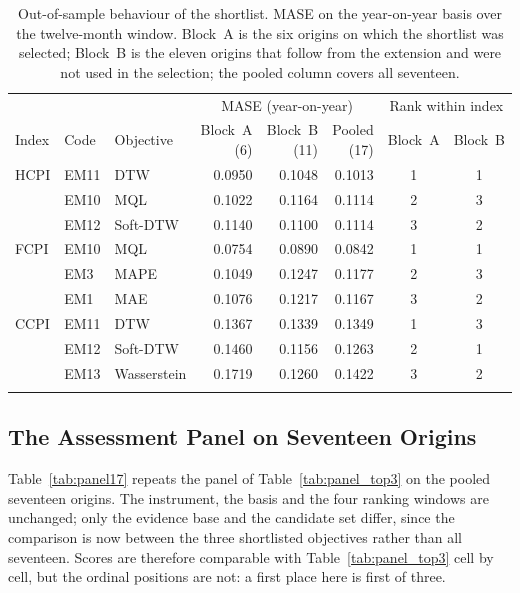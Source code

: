 \documentclass[12pt]{article}
\begin{document}
\begin{table}[htbp]\centering
\caption{Out-of-sample behaviour of the shortlist. MASE on the year-on-year basis over the twelve-month window. Block~A is the six origins on which the shortlist was selected; Block~B is the eleven origins that follow from the extension and were not used in the selection; the pooled column covers all seventeen.}
\label{tab:stability}
\begin{threeparttable}\small
\begin{tabular}{@{}l l l r r r c c@{}}
\toprule
 & & & \multicolumn{3}{c}{MASE (year-on-year)} & \multicolumn{2}{c}{Rank within index} \\
\cmidrule(lr){4-6}\cmidrule(lr){7-8}
Index & Code & Objective & Block~A (6) & Block~B (11) & Pooled (17) & Block~A & Block~B \\
\midrule
HCPI & EM11 & DTW & 0.0950 & 0.1048 & 0.1013 & 1 & 1 \\
 & EM10 & MQL & 0.1022 & 0.1164 & 0.1114 & 2 & 3 \\
 & EM12 & Soft-DTW & 0.1140 & 0.1100 & 0.1114 & 3 & 2 \\
\addlinespace[2pt]
FCPI & EM10 & MQL & 0.0754 & 0.0890 & 0.0842 & 1 & 1 \\
 & EM3 & MAPE & 0.1049 & 0.1247 & 0.1177 & 2 & 3 \\
 & EM1 & MAE & 0.1076 & 0.1217 & 0.1167 & 3 & 2 \\
\addlinespace[2pt]
CCPI & EM11 & DTW & 0.1367 & 0.1339 & 0.1349 & 1 & 3 \\
 & EM12 & Soft-DTW & 0.1460 & 0.1156 & 0.1263 & 2 & 1 \\
 & EM13 & Wasserstein & 0.1719 & 0.1260 & 0.1422 & 3 & 2 \\
\addlinespace[2pt]
\bottomrule
\end{tabular}
\end{threeparttable}
\end{table}

\subsection{The Assessment Panel on Seventeen Origins}
\label{sec:res-panel17}

Table~\ref{tab:panel17} repeats the panel of
Table~\ref{tab:panel_top3} on the pooled seventeen origins. The instrument,
the basis and the four ranking windows are unchanged; only the evidence base
and the candidate set differ, since the comparison is now between the three
shortlisted objectives rather than all seventeen. Scores are therefore
comparable with Table~\ref{tab:panel_top3} cell by cell, but the ordinal
positions are not: a first place here is first of three.
\end{document}
